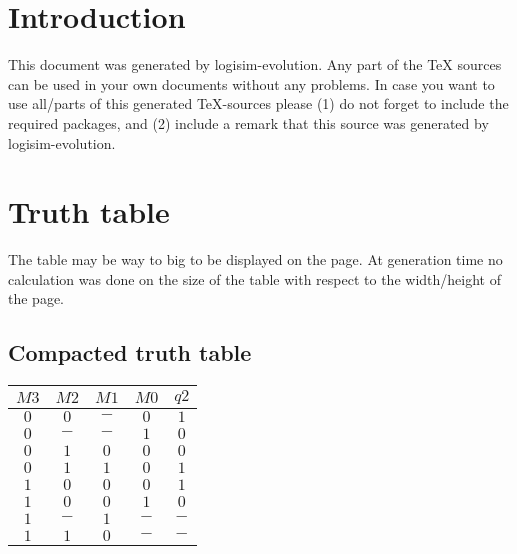 \documentclass [15pt,a4paper,twoside]{article}
\begin{document}
\section{Introduction}
This document was generated by logisim-evolution. Any part of the TeX sources can be used in your own documents without any problems. In case you want to use all/parts of this generated TeX-sources please (1) do not forget to include the required packages, and (2) include a remark that this source was generated by logisim-evolution.
\section{Truth table}
The table may be way to big to be displayed on the page. At generation time no calculation was done on the size of the table with respect to the width/height of the page.
\subsection{Compacted truth table}
\begin{center}
\begin{tabular}{cccc|c}
$M3$&$M2$&$M1$&$M0$&$q2$\\
\hline
$0$&$0$&$-$&$0$&$1$\\
$0$&$-$&$-$&$1$&$0$\\
$0$&$1$&$0$&$0$&$0$\\
$0$&$1$&$1$&$0$&$1$\\
$1$&$0$&$0$&$0$&$1$\\
$1$&$0$&$0$&$1$&$0$\\
$1$&$-$&$1$&$-$&$-$\\
$1$&$1$&$0$&$-$&$-$\\

\end{tabular}
\end{center}
\end{document}
